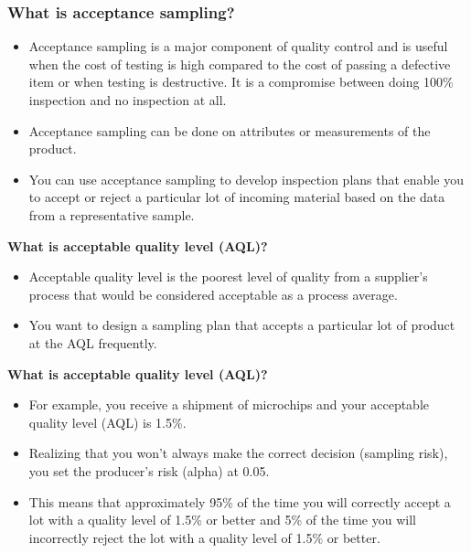 \documentclass{beamer}
\begin{document}
\begin{frame}
	\frametitle{ What is acceptance sampling? }
	\large
	\begin{itemize}
		\item Acceptance sampling is a major component of quality control and is useful when the cost of testing is high compared to the cost of passing a defective item or when testing is destructive. It is a compromise between doing 100\% inspection and no inspection at all. 
		\item Acceptance sampling can be done on attributes or measurements of the product.
		\item You can use acceptance sampling to develop inspection plans that enable you to accept or reject a particular lot of incoming material based on the 
		data from a representative sample.
	\end{itemize}
	
\end{frame}

\begin{frame}
	
	\noindent \textbf{What is acceptable quality level (AQL)?}
	
	\begin{itemize}
		\item Acceptable quality level is the poorest level of quality from a supplier's process that would be considered acceptable as a process average. 
		\item You want to design a sampling plan that accepts a particular lot of product at the AQL frequently.
	\end{itemize}
	
	
	
\end{frame}
\begin{frame}
	
	\noindent \textbf{What is acceptable quality level (AQL)?}
	
	\begin{itemize}
		\item 	For example, you receive a shipment of microchips and your acceptable quality level (AQL) is 1.5\%. 
		
		\item Realizing that you won't always make the correct decision (sampling risk), you set the producer's risk (alpha) at 0.05. 
		
		\item This means that approximately 95\% of the time you will correctly accept a lot with a quality level of 1.5\% or better and 5\% of the time you will incorrectly reject the lot with a quality level of 1.5\% or better.
	\end{itemize}

	
\end{frame}
\end{document}

